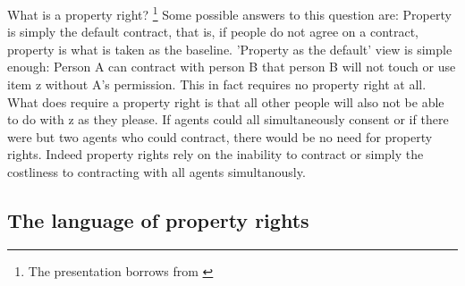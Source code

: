 \documentclass[12pt]{article}
\numberwithin{equation}{section}
\begin{document}
What is a property right? \footnote{The presentation borrows from \cite{Munzer1990}}
Some possible answers to this question are: Property is simply the default contract, that is, if people do not agree on a contract, property is what is taken as the baseline. 'Property as the default' view is simple enough: Person A can contract with person B that person B will not touch or use item z without A's permission. This in fact requires no property right at all. What does require a property right is that all other people will also not be able to do with z as they please. If agents could all simultaneously consent or if there were but two agents who could contract, there would be no need for property rights. Indeed property rights rely on the inability to contract or simply the costliness to contracting with all agents simultanously.



\subsection{The language of property rights}
\end{document}
